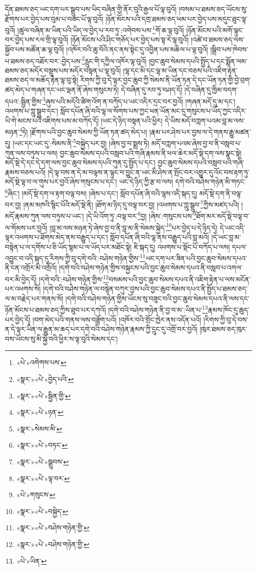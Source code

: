 དོན་ཐམས་ཅད་ཡང་དག་པར་སྒྲུབ་པས་ཡིད་བཞིན་གྱི་ནོར་བུའི་རྒྱལ་པོ་ལྟ་བུའོ། །བསམ་པ་ཐམས་ཅད་ཡོངས་སུ་རྫོགས་པར་བྱེད་པས་བུམ་པ་བཟང་པོ་ལྟ་བུའོ། །ཉོན་མོངས་པའི་དགྲ་ཐམས་ཅད་ཕམ་པར་བྱེད་པས་མདུང་ཐུང་ལྟ་བུའོ། །ཚུལ་བཞིན་མ་ཡིན་པའི་ཡིད་ལ་བྱེད་པ་རབ་ཏུ་:འགེབས་པས་\footnote{«པེ་»འགེགས་པས་}གོ་ཆ་ལྟ་བུའོ། །ཉོན་མོངས་པའི་མགོ་ལྟུང་བར་བྱེད་པས་རལ་གྲི་ལྟ་བུའོ། །ཉོན་མོངས་པའི་ཤིང་གཅོད་པར་བྱེད་པས་སྟ་རེ་ལྟ་བུའོ། །འཚེ་བ་ཐམས་ཅད་ལས་སྐྱོབ་པས་མཚོན་ཆ་ལྟ་བུའོ། །འཁོར་བའི་ཆུ་བོའི་ནང་ནས་སྟེང་དུ་འབྱིན་པས་མཆིལ་པ་ལྟ་བུའོ། །སྒྲིབ་པས་ཁེབས་པ་ཐམས་ཅད་འཐོར་བར་:བྱེད་པས་\footnote{«སྣར་»«པེ་»བྱེད་པའི་}རླུང་གི་དཀྱིལ་འཁོར་ལྟ་བུའོ། །བྱང་ཆུབ་སེམས་དཔའི་སྤྱོད་པ་དང་སྨོན་ལམ་ཐམས་ཅད་མདོར་བསྡུས་པས་མདོར་བསྟན་པ་ལྟ་བུའོ། །ལྷ་དང་མི་དང་ལྷ་མ་ཡིན་དང་བཅས་པའི་འཇིག་རྟེན་ཐམས་ཅད་ལ་མཆོད་རྟེན་ལྟ་བུ་སྟེ། རིགས་ཀྱི་བུ་དེ་ལྟར་བྱང་ཆུབ་ཀྱི་སེམས་ནི་ཡོན་ཏན་དེ་དང་ཡོན་ཏན་གྱི་བྱེ་བྲག་ཚད་མེད་པ་གཞན་དང་ཡང་ལྡན་ནོ་ཞེས་གསུངས་ཏེ། དེ་བཞིན་དུ་རབ་ཏུ་བཤད་དོ། །དེ་བཞིན་དུ་ཁྱིམ་བདག་དཔའ་:སྦྱིན་གྱིས་\footnote{«སྣར་»«པེ་»སྦྱིན་གྱི་}ཞུས་པའི་མདོའི་ཚིག་འོག་ན་བཀོད་པ་ཡང་འདིར་དྲང་བར་བྱའོ། །གཞན་མདོ་དུ་མ་དང་། འཕགས་པ་ཀླུ་སྒྲུབ་དང་། སློབ་དཔོན་ཞི་བའི་ལྷ་ལ་སོགས་པས་ཀྱང་ཕན་ཡོན་མང་དུ་གསུངས་པ་ཡོད་ཀྱང་འདིར་ཡི་གེ་མངས་པའི་འཇིགས་པས་མ་བཀོད་དོ། །ཡང་དེ་ཉིད་བསྟན་པའི་ཕྱིར། དེ་ཡིས་མདོ་བཀླག་པའམ་བླ་མ་ལས་མཉན་\footnote{«སྣར་»«པེ་»ཉན་}ཏེ། །རྫོགས་པའི་བྱང་ཆུབ་སེམས་ཀྱི་ཡོན་ཏན་ཚད་མེད་པ། །རྣམ་པར་ཤེས་པར་བྱས་ལ་དེ་གནས་རྒྱུ་མཚན་དུ། །ཡང་དང་ཡང་དུ་:སེམས་ནི་\footnote{«སྣར་»སེམས་མི་}བསྐྱེད་པར་བྱ། །ཞེས་བྱ་བ་སྨྲས་ཏེ། མདོ་བཀླག་པའམ་ཞེས་བྱ་བ་ནི་བསླབ་པ་ཀུན་ལས་བཏུས་པ་ལས། བྱང་ཆུབ་སེམས་དཔའི་བསླབ་པའི་གཞི་རྣམས་ནི་ཕལ་ཆེར་མདོ་སྡེ་དག་ལས་སྣང་སྟེ། མདོ་སྡེ་དེ་དང་དེ་དག་ལས་བྱང་ཆུབ་སེམས་དཔའི་ཀུན་དུ་སྤྱོད་པ་དང་། བྱང་ཆུབ་སེམས་དཔའི་བསླབ་པའི་གཞི་རྣམས་བཅས་པའོ། །དེ་ལྟ་བས་ན་དེ་མ་བལྟས་ན་ལྟུང་བ་བྱུང་ན་ཡང་མི་ཤེས་ན་སྤོང་བར་འགྱུར་དུ་འོང་བས་རྟག་ཏུ་མདོ་སྡེ་ལྟ་བ་ལ་གུས་པར་བྱའོ་ཞེས་གསུངས་པ་དང་། ཡང་དེ་ཉིད་ཀྱི་རྩ་བ་ལས། དགེ་བའི་བཤེས་གཉེན་མི་གཏང་\footnote{«སྣར་»«པེ་»བཏང་}ཞིང་། །མདོ་སྡེ་དག་ལ་རྟག་བལྟ་བས། །ཞེས་པ་དང་། སློབ་དཔོན་ཞི་བའི་ལྷས་འདི་སྐད་དུ། མདོ་སྡེ་དག་ནི་བལྟ་བར་བྱ། །ནམ་མཁའི་སྙིང་པོའི་མདོ་སྡེ་ནི། །ཐོག་མ་ཉིད་དུ་བལྟ་བར་བྱ། །འཕགས་པ་ཀླུ་སྒྲུབ་\footnote{«སྣར་»«པེ་»སྒྲུབས་}ཀྱིས་མཛད་པའི། །མདོ་རྣམས་ཀུན་ལས་བཏུས་པ་ཡང་། །དེ་ཡི་འོག་ཏུ་:བལྟ་བར་\footnote{«སྣར་»«པེ་»ལྟ་བར་}བྱ། །ཞེས་:གསུངས་པས་\footnote{«པེ་»གསུངས་}ཐོག་མར་མདོ་སྡེ་བལྟ་བ་ལ་གོམས་པར་བྱའོ། །བླ་མ་ལས་མཉན་ཏེ་ཞེས་བྱ་བ་ནི་བླ་མ་ནི་སེམས་སྐྱེད་\footnote{«སྣར་»«པེ་»བསྐྱེད་}པར་བྱེད་པ་དེ་ཉིད་དེ། དེ་ཡང་འདི་ལྟར་འཕགས་པ་ཐོགས་མེད་ནས་བརྒྱུད་པ་དང་། སློབ་དཔོན་ཞི་བའི་ལྷ་ནས་བརྒྱུད་པའི་བླ་མའོ། །དེ་ཡང་བླ་མ་བསྟེན་པ་ལ་དགོས་པ་ཅི་ཡོད་སྙམ་པ་ལ་ཡོད་པར་མཐོང་སྟེ། ཇི་སྐད་དུ། འཕགས་པ་སྡོང་པོ་བཀོད་པ་ལས། དཔལ་འབྱུང་བ་འདི་སྐད་དུ་རིགས་ཀྱི་བུ་དགེ་བའི་:བཤེས་གཉེན་གྱིས་\footnote{«སྣར་»«པེ་»བཤེས་གཉེན་གྱི་}ཡང་དག་པར་ཟིན་པའི་བྱང་ཆུབ་སེམས་དཔའ་ནི་ངན་འགྲོར་མི་འགྲོའོ། །དགེ་བའི་བཤེས་གཉེན་གྱིས་བསྐྱངས་པའི་བྱང་ཆུབ་སེམས་དཔའ་ནི་བསླབ་པ་འགལ་བར་མི་བྱེད་དོ། །དགེ་བའི་:བཤེས་གཉེན་གྱིས་\footnote{«སྣར་»«པེ་»བཤེས་གཉེན་གྱི་}བསམས་པའི་བྱང་ཆུབ་སེམས་དཔའ་ནི་འཇིག་རྟེན་པ་ལས་མངོན་པར་འཕགས་སོ། །དགེ་བའི་བཤེས་གཉེན་ལ་བསྙེན་བཀུར་བྱས་པའི་བྱང་ཆུབ་སེམས་དཔའ་ནི་སྤྱོད་པ་ཐམས་ཅད་ལ་མ་བརྗེད་པར་གནས་སོ། །དགེ་བའི་བཤེས་གཉེན་གྱིས་ཡོངས་སུ་བཟུང་བའི་བྱང་ཆུབ་སེམས་དཔའ་ནི་ལས་དང་ཉོན་མོངས་པ་ཐམས་ཅད་ཀྱིས་ཐུབ་པར་དཀའོ། །དགེ་བའི་བཤེས་གཉེན་ནི་བྱ་བ་མ་:ཡིན་པ་\footnote{«པེ་»ཡིན་}རྣམས་ཁོང་དུ་ཆུད་པར་བྱེད་དོ། །བག་མེད་པའི་གནས་ལས་བཟློག་པའོ། །འཁོར་བའི་གྲོང་ཁྱེར་ནས་འདོན་པའོ། །རིགས་ཀྱི་བུ་དེ་བས་ན་དེ་ལྟར་ཡིན་ལ་རྒྱུན་མ་ཆད་པར་དགེ་བའི་བཤེས་གཉེན་རྣམས་ཀྱི་དྲུང་དུ་འགྲོ་བར་བྱའོ། །ཁུར་ཐམས་ཅད་ཁུར་བས་ཡོངས་སུ་མི་སྐྱོ་བའི་ཕྱིར་ས་ལྟ་བུའི་སེམས་དང་། 
